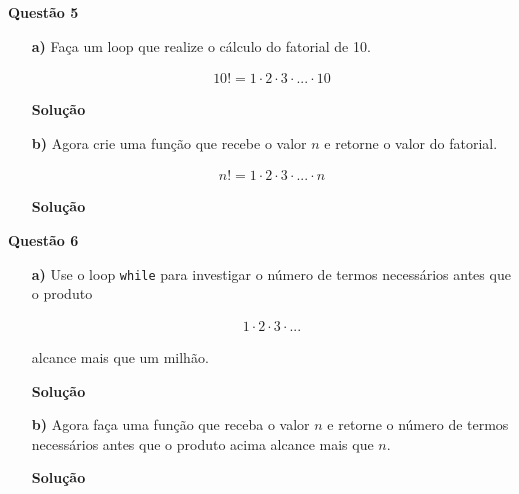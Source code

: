 \documentclass[12pt, a4paper]{article}
\begin{document}
\textbf{Questão 5}

\begin{itemize}
	\item[\textbf{a)}] Faça um loop que realize o cálculo do fatorial de 10.
	
		\begin{align*}
			10! = 1\cdot 2\cdot 3 \cdot ... \cdot 10
		\end{align*}
	
	
	
	\textbf{Solução}
	
	
	
	

	\item[\textbf{b)}] Agora crie uma função que recebe o valor $n$ e retorne o valor do fatorial.
	
		\begin{align*}
			n! = 1\cdot 2\cdot 3 \cdot ... \cdot n
		\end{align*}
	
	
	
	\textbf{Solução}
	
	
	
	
	
\end{itemize}






\textbf{Questão 6}

\begin{itemize}
	\item[\textbf{a)}] Use o loop \texttt{while} para investigar o número de termos necessários antes que o produto
	
		\begin{align*}
			1\cdot 2\cdot 3\cdot ...
		\end{align*}
	
	alcance mais que um milhão. 
	
	
	
	\textbf{Solução}
	
	
	
	
	
	\item[\textbf{b)}] Agora faça uma função que receba o valor $n$ e retorne o número de termos necessários antes que o produto acima alcance mais que $n$.
	
	
	
	\textbf{Solução}
	
	
	
	
	
\end{itemize}
		
\end{document}
